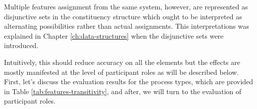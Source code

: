     Multiple features assignment from the same system, however, are represented as disjunctive sets in the constituency structure which ought to be interpreted as alternating possibilities rather than actual assignments. This interpretations was explained in Chapter \ref{ch:data-structures} when the disjunctive sets were introduced.
    
    Intuitively, this should reduce accuracy on all the elements but the effects are mostly manifested at the level of participant roles as will be described below. First, let's discuss the evaluation results for the process types, which are provided in Table \ref{tab:features-transitivity}, and after, we will turn to the evaluation of participant roles.
    
    \begin{table}[!ht]
    \centering
    \caption{The evaluation statistics available for the PROCESS-TYPE system and few of its subsystems from the TRANSITIVITY system network}
    \label{tab:features-transitivity}
    \end{table}
    
